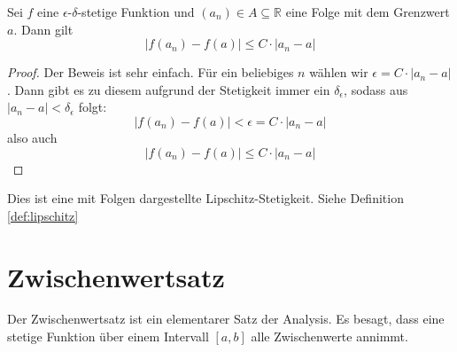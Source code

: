 \begin{lemma}\label{lem:stetig}
Sei $f$ eine $\epsilon$-$\delta$-stetige Funktion und $(a_n)\in A \subseteq \mathbb{R}$ eine Folge mit dem Grenzwert $a$. Dann gilt
\[
|f(a_n)-f(a)| \le C\cdot |a_n -a|
\]
\end{lemma}
\begin{proof}
Der Beweis ist sehr einfach. Für ein beliebiges $n$ wählen wir $\epsilon = C\cdot |a_n -a|$. Dann gibt es zu diesem aufgrund der Stetigkeit immer ein $\delta_\epsilon$, sodass aus $|a_n-a|<\delta_\epsilon$ folgt:
\[
|f(a_n)-f(a)| < \epsilon = C\cdot |a_n -a|
\]
also auch
\[
|f(a_n)-f(a)| \le C\cdot |a_n -a|
\]
\end{proof}

\begin{remark}
Dies ist eine mit Folgen dargestellte Lipschitz-Stetigkeit. Siehe Definition \ref{def:lipschitz}
\end{remark}

\section{Zwischenwertsatz}

Der Zwischenwertsatz ist ein elementarer Satz der Analysis. Es besagt, dass eine stetige Funktion über einem Intervall $[a,b]$ alle Zwischenwerte annimmt.

